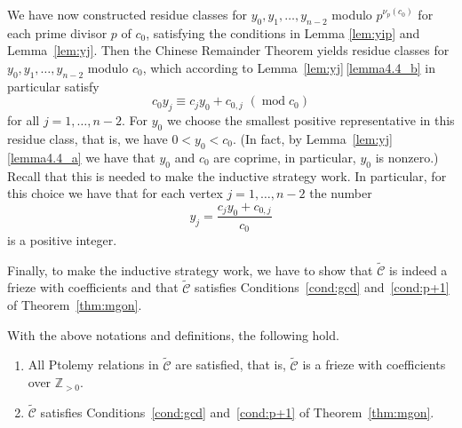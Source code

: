 \documentclass[ALCO,ThmDefs,Unicode,epreuves,published]{cedram}
\numberwithin{equation}{section}
\DeclareMathOperator{\md}{mod}
\begin{document}
We have now constructed 
residue classes for $y_0,y_1,\ldots, y_{n-2}$ modulo $p^{\nu_p(c_0)}$
for each prime divisor $p$ of $c_0$, satisfying the conditions in Lemma 
\ref{lem:yip} and Lemma~\ref{lem:yj}. 
Then the Chinese Remainder Theorem 
yields residue classes for $y_0,y_1,\ldots, y_{n-2}$ modulo $c_0$,
which according to Lemma~\ref{lem:yj}\,\ref{lemma4.4_b} in particular satisfy
\[
c_0y_j \equiv c_jy_0 + c_{0,j}\,\,(\md c_0)
\]
for all $j=1,\ldots,n-2$. For $y_0$ we choose 
the smallest positive representative in this residue class, that is, we
have $0< y_0 < c_0$. (In fact, by Lemma~\ref{lem:yj}\,\ref{lemma4.4_a} we have that
$y_0$ and $c_0$ are coprime, in particular, $y_0$ is nonzero.) 
Recall that this is needed to make the inductive strategy work. 
In particular, for this choice we have that for each vertex $j=1,\ldots, n-2$ the 
number 
\begin{equation} \label{eq:yj}
 y_j = \frac{c_jy_0 + c_{0,j}}{c_0}
 \end{equation}
is a positive integer. 

Finally, to make the inductive strategy work, we have to show that 
$\widetilde{\mathcal{C}}$ is indeed a frieze with coefficients and that 
$\widetilde{\mathcal{C}}$ satisfies Conditions~\eqref{cond:gcd} and~\eqref{cond:p+1} of Theorem~\ref{thm:mgon}. 


\begin{prop}
With the above notations and definitions, the following hold.
\begin{enumerate}[label=(\alph*)]
 \item\label{prop4.5_a} %
 All Ptolemy relations in 
$\widetilde{\mathcal{C}}$ are satisfied, that is, $\widetilde{\mathcal{C}}$
is a frieze with coefficients over $\mathbb{Z}_{>0}$.
\item\label{prop4.5_b} %
$\widetilde{\mathcal{C}}$ satisfies Conditions~\eqref{cond:gcd} and~\eqref{cond:p+1} of Theorem~\ref{thm:mgon}. 
\end{enumerate}
\end{prop}
\end{document}
